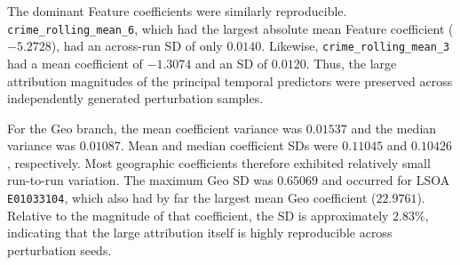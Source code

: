 The dominant Feature coefficients were similarly reproducible.
\texttt{crime\_rolling\_mean\_6}, which had the largest absolute mean Feature
coefficient ($-5.2728$), had an across-run SD of only $0.0140$.
Likewise, \texttt{crime\_rolling\_mean\_3} had a mean coefficient of
$-1.3074$ and an SD of $0.0120$. Thus, the large attribution magnitudes of
the principal temporal predictors were preserved across independently
generated perturbation samples.

For the Geo branch, the mean coefficient variance was $0.01537$ and the
median variance was $0.01087$. Mean and median coefficient SDs were
$0.11045$ and $0.10426$, respectively. Most geographic coefficients
therefore exhibited relatively small run-to-run variation. The maximum Geo
SD was $0.65069$ and occurred for LSOA \texttt{E01033104}, which also had by
far the largest mean Geo coefficient ($22.9761$). Relative to the magnitude of that coefficient, the SD is approximately $2.83\%$, indicating that the large attribution itself is highly reproducible across perturbation seeds.




